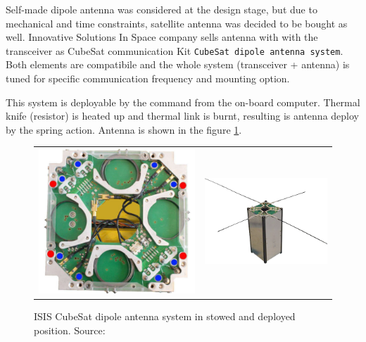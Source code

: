 Self-made dipole antenna was considered at the design stage, but due to mechanical and time constraints, satellite antenna was decided to be bought as well. Innovative Solutions In Space company sells antenna with with the transceiver as CubeSat communication Kit \texttt{CubeSat dipole antenna system}. Both elements are compatibile and the whole system (transceiver + antenna) is tuned for specific communication frequency and mounting option.

This system is deployable by the command from the on-board computer. Thermal knife (resistor) is heated up and thermal link is burnt, resulting is antenna deploy by the spring action. Antenna is shown in the figure \ref{ISIS_antenna}.

\begin{figure}
   \centering
\begin{tabular}{cc}
        \includegraphics[width=0.3\paperwidth]{img/4/isis_antenna_stowed.jpg}
    & 
        \includegraphics[width=0.45\paperwidth]{img/4/CubeSat-antenna-dipole-configuration.png}    
\end{tabular}
\label{ISIS_antenna}
\caption{ISIS CubeSat dipole antenna system in stowed and deployed position. Source: \cite{isis_dipole_antenna}}
\end{figure}


